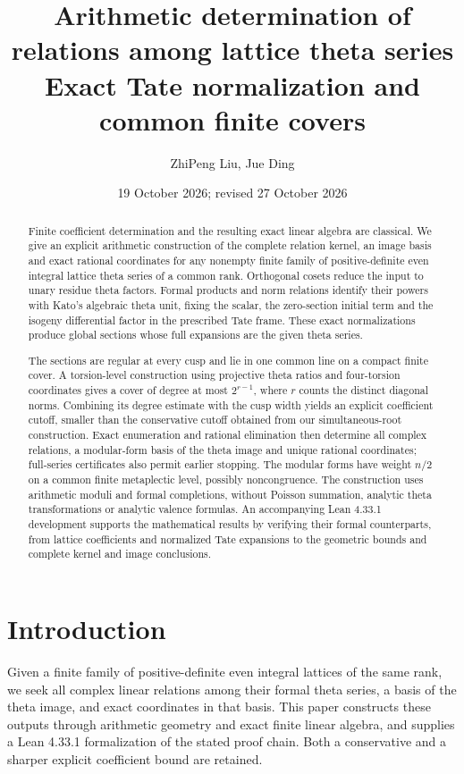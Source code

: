 \documentclass[11pt]{article}
\title{Arithmetic determination of relations among lattice theta series\\
\large Exact Tate normalization and common finite covers}
\author{ZhiPeng Liu, Jue Ding}
\date{19 October 2026; revised 27 October 2026}
\theoremstyle{remark}\newtheorem{remark}[theorem]{Remark}
\begin{document}
\maketitle
\begin{abstract}
Finite coefficient determination and the resulting exact linear algebra are
classical. We give an explicit arithmetic construction of the complete
relation kernel, an image basis and exact rational coordinates for any
nonempty finite family of positive-definite even integral lattice theta
series of a common rank. Orthogonal cosets reduce the input to unary residue
theta factors. Formal products and norm relations identify their powers
with Kato's algebraic theta unit, fixing the scalar, the zero-section initial
term and the isogeny differential factor in the prescribed Tate frame.
These exact normalizations produce global sections whose full expansions
are the given theta series.

The sections are regular at every cusp and lie in one common line on a
compact finite cover. A torsion-level construction using projective theta
ratios and four-torsion coordinates gives a cover of degree at most
$2^{r-1}$, where $r$ counts the distinct diagonal norms. Combining its
degree estimate with the cusp width yields an explicit coefficient cutoff,
smaller than the conservative cutoff obtained from our simultaneous-root
construction. Exact enumeration and rational elimination then determine
all complex relations, a modular-form basis of the theta image and unique
rational coordinates; full-series certificates also permit earlier stopping.
The modular forms have weight $n/2$ on a common finite metaplectic level,
possibly noncongruence. The construction uses arithmetic moduli and formal
completions, without Poisson summation, analytic theta transformations or
analytic valence formulas. An accompanying Lean 4.33.1 development supports
the mathematical results by verifying their formal counterparts, from
lattice coefficients and normalized Tate expansions to the geometric bounds
and complete kernel and image conclusions.
\end{abstract}

\section{Introduction}
Given a finite family of positive-definite even integral lattices of the same
rank, we seek all complex linear relations among their formal theta series,
a basis of the theta image, and exact coordinates in that basis. This paper
constructs these outputs through arithmetic geometry and exact finite linear
algebra, and supplies a Lean 4.33.1 formalization of the stated proof chain.
Both a conservative and a sharper explicit coefficient bound are retained.
\end{document}
